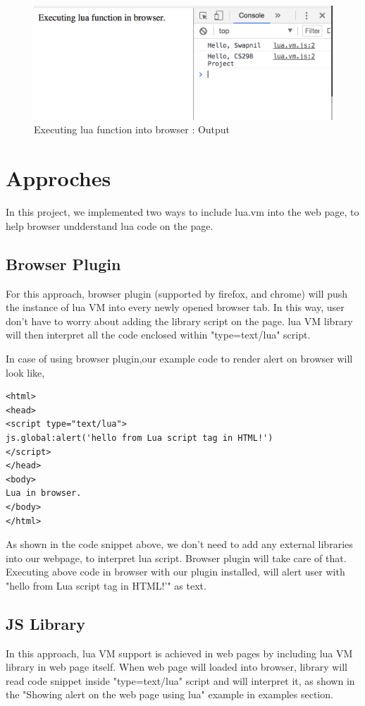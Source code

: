 \begin{figure}[H]
	\begin{center}
		\includegraphics[width=\linewidth]{./images/lua-functions.png}
	\end{center}
	\caption{Executing lua function into browser : Output}
	\label{fig:luafunction}
\end{figure}


\section{Approches}

In this project, we implemented two ways to include lua.vm into the web page, to help browser undderstand lua code on the page.


\subsection{Browser Plugin } 
For this approach, browser plugin (supported by firefox, and chrome) will push the instance of lua VM into every newly opened browser tab. In this way, user don't have to worry about adding the library script on the page. lua VM library will then interpret all the code enclosed within "type=text/lua" script.

In case of using browser plugin,our example code to render alert on browser will look like, 

\begin{lstlisting}[frame=single]
<html>
<head>
<script type="text/lua">
js.global:alert('hello from Lua script tag in HTML!') 
</script>
</head>
<body>
Lua in browser.
</body>
</html>
\end{lstlisting}


As shown in the code snippet above, we don't need to add any external libraries into our webpage, to interpret lua script. Browser plugin will take care of that.
Executing above code in browser with our plugin installed, will alert user with "hello from Lua script tag in HTML!'" as text.


\subsection{JS Library}


In this approach, lua VM support is achieved in web pages by including lua VM library in web page itself. When web page will loaded into browser,  library will read code snippet inside "type=text/lua" script and will interpret it, as shown in the "Showing alert on the web page using lua" example in examples section. 
